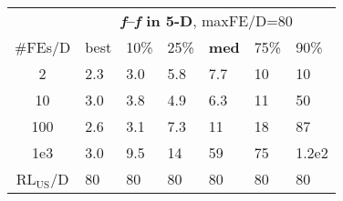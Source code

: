 \begin{tabular}{c|llllll}
 & \multicolumn{6}{|c}{\textbf{\textit{f}\raisebox{-0.35ex}{1}--\textit{f}\raisebox{-0.35ex}{24} in 5-D}, maxFE/D=80}\\
\#FEs/D & best & 10\% & 25\% & \textbf{med} & 75\% & 90\%\\
2 & \hspace*{1ex}2.3 & \hspace*{1ex}3.0 & \hspace*{1ex}5.8 & \hspace*{1ex}7.7 & 10 & 10\\
10 & \hspace*{1ex}3.0 & \hspace*{1ex}3.8 & \hspace*{1ex}4.9 & \hspace*{1ex}6.3 & 11 & 50\\
100 & \hspace*{1ex}2.6 & \hspace*{1ex}3.1 & \hspace*{1ex}7.3 & 11 & 18 & 87\\
1e3 & \hspace*{1ex}3.0 & \hspace*{1ex}9.5 & 14 & 59 & 75 & 1.2e2\\
$\text{RL}_{\text{US}}$/D & 80 & 80 & 80 & 80 & 80 & 80
\end{tabular}
